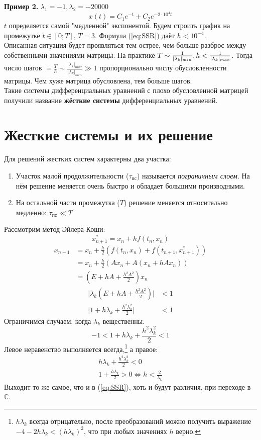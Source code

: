 \documentclass[a4paper,11pt]{article}
\begin{document}
\textbf{Пример 2.} $\lambda_1 = -1, \lambda_2 = -20000$
\[x(t) = C_1e^{-t} + C_2e^{-2\cdot 10^4t}\]
$t$ определяется самой "медленной" экспонентой.
Будем строить график на промежутке $t \in [0; T],\, T = 3$. Формула (\ref{eq:SSR}) даёт $h < 10^{-4}$. \\

\noindent Описанная ситуация будет проявляться тем острее, чем больше разброс между собственными значениями матрицы.
На практике $T \sim \frac{1}{|\lambda_k|_{min}},\, \\ h < \frac{1}{|\lambda_k|_{max}}$.
Тогда число шагов $= \frac{T}{h} \sim \frac{|\lambda_k|_{max}}{|\lambda_k|_{min}} \gg 1$ пропорционально числу обусловленности матрицы. Чем хуже матрица
  обусловлена, тем больше шагов. \\

\noindent Такие системы дифференциальных уравнений с плохо обусловленной матрицей получили название \textbf{жёсткие системы} дифференциальных уравнений.

\section{Жесткие системы и их решение}
\noindent Для решений жестких систем характерны два участка:
\begin{enumerate}
  \item Участок малой продолжительности ($\tau_{\text{пс}}$) называется \textit{пограничным слоем}. На нём решение меняется очень быстро и обладает большими производными.
  \item На остальной части промежутка ($T$) решение меняется относительно медленно: $\tau_{\text{пс}} \ll T$
\end{enumerate}
Рассмотрим метод Эйлера-Коши:
\[x_{n+1}^* = x_n + hf(t_n, x_n)\]
\begin{align*}
  x_{n+1} &= x_n + \frac{h}{2}(f(t_n, x_n) + f(t_{n+1}, x_{n+1}^*)) \\
          &= x_n + \frac{h}{2}(Ax_n + A(x_n + hAx_n)) \\
          &= (E + hA + \frac{h^2A^2}{2})x_n
\end{align*}
\begin{align*}
  \Big|\lambda_k(E + hA + \frac{h^2A^2}{2})\Big| &< 1 \\
  \Big|1 + h\lambda_k + \frac{h^2\lambda_k^2}{2}\Big| &< 1
\end{align*}
Ограничимся случаем, когда $\lambda_k$ вещественны.
\[-1 < 1 + h\lambda_k + \frac{h^2\lambda_k^2}{2} < 1\]
Левое неравенство выполняется всегда,\footnote{$h\lambda_k$ всегда отрицательно, после преобразований можно получить выражение \\
      $-4-2h\lambda_k < (h\lambda_k)^2$, что при любых значениях $h$ верно.} а правое:
\begin{gather*}
  h\lambda_k + \frac{h^2\lambda_k^2}{2} < 0 \\
  1 + \frac{h\lambda_k}{2} > 0 \Leftrightarrow h < \frac{2}{\lambda_k}
\end{gather*}
Выходит то же самое, что и в (\ref{eq:SSR}), хоть и будут различия, при переходе в $\mathbb{C}$. \\
\end{document}
